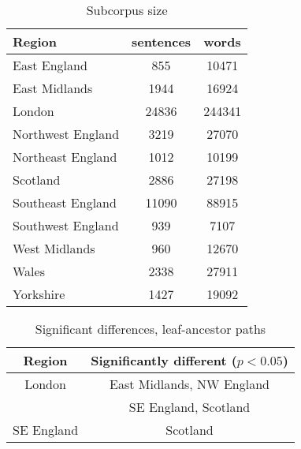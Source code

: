 \documentclass[11pt]{article}
\begin{document}
\begin{table}
\begin{tabular}{|lcc|} \hline
Region & sentences & words \\
\hline \hline
 East England & 855 & 10471 \\ \hline
 East Midlands & 1944 & 16924 \\ \hline
 London & 24836& 244341 \\ \hline
 Northwest England & 3219 & 27070 \\ \hline
 Northeast England &  1012 & 10199 \\ \hline
 Scotland & 2886 & 27198 \\ \hline
 Southeast England & 11090  & 88915 \\ \hline
 Southwest England & 939 & 7107 \\ \hline
 West Midlands &  960 &  12670 \\ \hline
 Wales & 2338 & 27911 \\ \hline
 Yorkshire & 1427 & 19092 \\ \hline
\end{tabular}
\label{size}
\caption{Subcorpus size}
\end{table}

\begin{table}
  \begin{tabular}{|c|c|} \hline %
    Region & Significantly different ($p < 0.05$) \\ \hline
    London & East Midlands, NW England \\
    & SE England, Scotland \\ \hline
    SE England & Scotland \\ \hline
  \end{tabular}
  \label{diffs}
\caption{Significant differences, leaf-ancestor paths}
\end{table}
\end{document}

